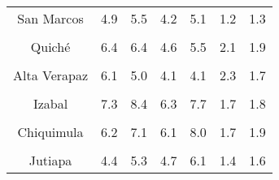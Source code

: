 \begin{tabular}[t]{ccccccc}
San Marcos & 4.9 & 5.5 & 4.2 & 5.1 & 1.2 & 1.3\\
\cellcolor[HTML]{B6B3FF}{Huehuetenango} & \cellcolor[HTML]{B6B3FF}{8.8} & \cellcolor[HTML]{B6B3FF}{9.4} & \cellcolor[HTML]{B6B3FF}{6.5} & \cellcolor[HTML]{B6B3FF}{7.8} & \cellcolor[HTML]{B6B3FF}{2.4} & \cellcolor[HTML]{B6B3FF}{2.3}\\
Quiché & 6.4 & 6.4 & 4.6 & 5.5 & 2.1 & 1.9\\
\cellcolor[HTML]{B6B3FF}{Baja Verapaz} & \cellcolor[HTML]{B6B3FF}{5.3} & \cellcolor[HTML]{B6B3FF}{5.6} & \cellcolor[HTML]{B6B3FF}{5.3} & \cellcolor[HTML]{B6B3FF}{5.9} & \cellcolor[HTML]{B6B3FF}{1.8} & \cellcolor[HTML]{B6B3FF}{1.7}\\
Alta Verapaz & 6.1 & 5.0 & 4.1 & 4.1 & 2.3 & 1.7\\
\cellcolor[HTML]{B6B3FF}{Petén} & \cellcolor[HTML]{B6B3FF}{12.0} & \cellcolor[HTML]{B6B3FF}{13.2} & \cellcolor[HTML]{B6B3FF}{11.1} & \cellcolor[HTML]{B6B3FF}{12.8} & \cellcolor[HTML]{B6B3FF}{3.2} & \cellcolor[HTML]{B6B3FF}{3.5}\\
Izabal & 7.3 & 8.4 & 6.3 & 7.7 & 1.7 & 1.8\\
\cellcolor[HTML]{B6B3FF}{Zacapa} & \cellcolor[HTML]{B6B3FF}{8.0} & \cellcolor[HTML]{B6B3FF}{9.7} & \cellcolor[HTML]{B6B3FF}{5.3} & \cellcolor[HTML]{B6B3FF}{6.7} & \cellcolor[HTML]{B6B3FF}{2.1} & \cellcolor[HTML]{B6B3FF}{2.5}\\
Chiquimula & 6.2 & 7.1 & 6.1 & 8.0 & 1.7 & 1.9\\
\cellcolor[HTML]{B6B3FF}{Jalapa} & \cellcolor[HTML]{B6B3FF}{7.1} & \cellcolor[HTML]{B6B3FF}{7.8} & \cellcolor[HTML]{B6B3FF}{7.1} & \cellcolor[HTML]{B6B3FF}{8.0} & \cellcolor[HTML]{B6B3FF}{1.7} & \cellcolor[HTML]{B6B3FF}{1.6}\\
Jutiapa & 4.4 & 5.3 & 4.7 & 6.1 & 1.4 & 1.6\\
\bottomrule
\end{tabular}
